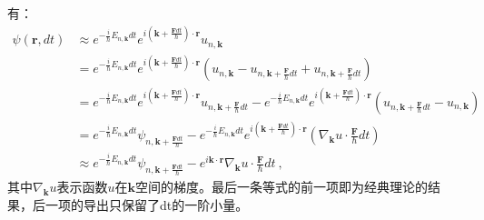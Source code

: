 有：
\begin{equation}
\begin{aligned}
\psi(\boldsymbol{r},dt)&\approx e^{-\frac{i}{\hbar}E_{n,\boldsymbol{k}}dt}e^{i(\boldsymbol{k}+\frac{\boldsymbol{F}dt}{\hbar})\cdot \boldsymbol{r}}u_{n,\boldsymbol{k}}\\
&=e^{-\frac{i}{\hbar}E_{n,\boldsymbol{k}}dt}e^{i(\boldsymbol{k}+\frac{\boldsymbol{F}dt}{\hbar})\cdot \boldsymbol{r}}(u_{n,\boldsymbol{k}}-u_{n,\boldsymbol{k}+\frac{\boldsymbol{F}}{\hbar}dt}+u_{n,\boldsymbol{k}+\frac{\boldsymbol{F}}{\hbar}dt})\\
&=e^{-\frac{i}{\hbar}E_{n,\boldsymbol{k}}dt}e^{i(\boldsymbol{k}+\frac{\boldsymbol{F}dt}{\hbar})\cdot \boldsymbol{r}}u_{n,\boldsymbol{k}+\frac{\boldsymbol{F}}{\hbar}dt}-e^{-\frac{i}{\hbar}E_{n,\boldsymbol{k}}dt}e^{i(\boldsymbol{k}+\frac{\boldsymbol{F}dt}{\hbar})\cdot \boldsymbol{r}}(u_{n,\boldsymbol{k}+\frac{\boldsymbol{F}}{\hbar}dt}-u_{n,\boldsymbol{k}})\\
&=e^{-\frac{i}{\hbar}E_{n,\boldsymbol{k}}dt}\psi_{n,\boldsymbol{k}+\frac{\boldsymbol{F}dt}{\hbar}}-e^{-\frac{i}{\hbar}E_{n,\boldsymbol{k}}dt}e^{i(\boldsymbol{k}+\frac{\boldsymbol{F}dt}{\hbar})\cdot \boldsymbol{r}}(\nabla_{\boldsymbol{k}} u\cdot \frac{\boldsymbol{F}}{\hbar}dt)\\
&\approx e^{-\frac{i}{\hbar}E_{n,\boldsymbol{k}}dt}\psi_{n,\boldsymbol{k}+\frac{\boldsymbol{F}dt}{\hbar}}-e^{i\boldsymbol{k}\cdot\boldsymbol{r}}\nabla_{\boldsymbol{k}} u\cdot \frac{\boldsymbol{F}}{\hbar}dt~,
\end{aligned}
\end{equation}
其中$\nabla_{\boldsymbol{k}} u$表示函数$u$在$\boldsymbol{k}$空间的梯度。最后一条等式的前一项即为经典理论的结果，后一项的导出只保留了dt的一阶小量。

